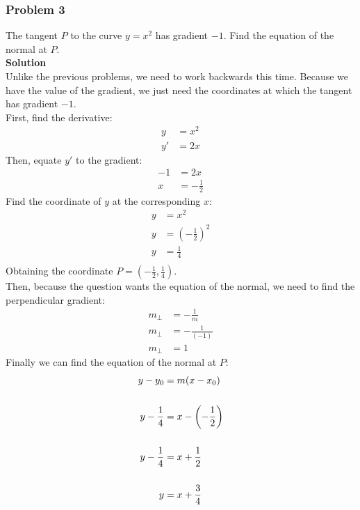 \documentclass[hidelinks, a4paper, 12pt]{article}
\newcommand{\bd}{\textbf}
\newcommand{\n}{\\[\baselineskip]}
\begin{document}
            \subsubsection{Problem 3}
                The tangent $P$ to the curve $y = x^2$ has gradient $-1$. Find the equation of the normal at $P$.\n
                \bd{Solution}\n
                Unlike the previous problems, we need to work backwards this time. Because we have the value of the gradient, we just need the coordinates at which 
                the tangent has gradient $-1$.\n
                First, find the derivative:
                \[\begin{split}
                    y &= x^2\\
                    y' &= 2x
                \end{split}\]
                Then, equate $y'$ to the gradient:
                \[\begin{split}
                    -1 &= 2x\\
                    x &= -\frac{1}{2}
                \end{split}\]
                Find the coordinate of $y$ at the corresponding $x$:
                \[\begin{split}
                    y &= x^2\\
                    y &= \left(-\frac{1}{2}\right)^2\\
                    y &= \frac{1}{4}\\
                \end{split}\]
                Obtaining the coordinate $P = \left(-\frac{1}{2}, \frac{1}{4}\right)$.\n
                Then, because the question wants the equation of the normal, we need to find the perpendicular gradient:
                \[\begin{split}
                    m_\perp &= -\frac{1}{m}\\
                    m_\perp &= -\frac{1}{(-1)}\\
                    m_\perp &= 1
                \end{split}\]
                Finally we can find the equation of the normal at $P$:
                \[\begin{split}
                    y-y_0 &= m(x-x_0)\n
                    y-\frac{1}{4} &= x - \left(-\frac{1}{2}\right)\n
                    y-\frac{1}{4} &= x +\frac{1}{2}\n
                    y &= x + \frac{3}{4}
                \end{split}\]
            
\end{document}
